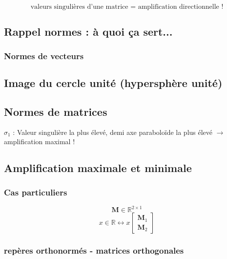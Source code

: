 \documentclass[document.tex]{subfiles}
\begin{document}
$$\boxed{\text{valeurs singulières d'une matrice = amplification directionnelle !}}$$


\subsection{Rappel normes : à quoi ça sert...}


\subsubsection{Normes de vecteurs}


\subsection{Image du cercle unité (hypersphère unité)}


\subsection{Normes de matrices}

 
 $\boxed{\sigma_1}$ : Valeur singulière la plus élevé, demi axe paraboloïde la plus élevé $\rightarrow$ amplification maximal !
 
\subsection{Amplification maximale et minimale}


\subsubsection{Cas particuliers}

$$\textbf{M} \in \mathbb{R}^{2\times 1} $$
$$ x \in \mathbb{R} \longleftrightarrow x\begin{bmatrix}
\textbf{M}_1 \\ \textbf{M}_2
\end{bmatrix} $$


\subsubsection{repères orthonormés - matrices orthogonales}
\end{document}
